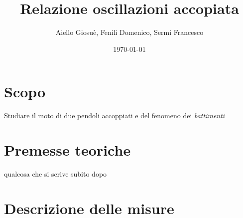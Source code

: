 \documentclass{article}
\title{Relazione oscillazioni accopiata}
\author{Aiello Giosuè, Fenili Domenico, Sermi Francesco}
\date{\today}
\begin{document}
\maketitle
\newpage
\tableofcontents
\section{Scopo}
Studiare il moto di due pendoli accoppiati e del fenomeno dei \emph{battimenti}
\section{Premesse teoriche}
qualcosa che si scrive subito dopo

\section{Descrizione delle misure}
\end{document}
